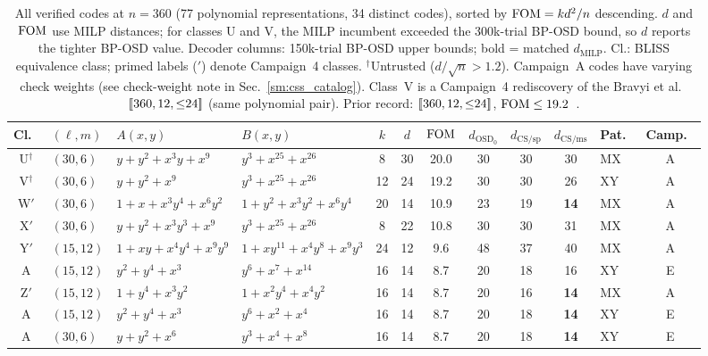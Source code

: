 \begin{table}[t]
\centering
\caption{All verified codes at $n = 360$ (77 polynomial representations, 34 distinct codes), sorted by $\mathrm{FOM} = kd^2/n$ descending.
$d$ and $\mathrm{FOM}$ use MILP distances; for classes U and V, the MILP incumbent exceeded the 300k-trial BP-OSD bound, so $d$ reports the tighter BP-OSD value.
Decoder columns: 150k-trial BP-OSD upper bounds; bold = matched $d_{\text{MILP}}$.
Cl.: BLISS equivalence class; primed labels ($'$) denote Campaign~4 classes.
$^\dagger$Untrusted ($d/\sqrt{n} > 1.2$).
Campaign~A codes have varying check weights (see check-weight note in Sec.~\ref{sm:css_catalog}).
Class~V is a Campaign~4 rediscovery of the Bravyi et al.\ $\lbrack\!\lbrack 360,12,{\leq}24 \rbrack\!\rbrack$ (same polynomial pair).
Prior record: $\lbrack\!\lbrack 360,12,{\leq}24 \rbrack\!\rbrack$, $\mathrm{FOM} \leq 19.2$~\protect\cite{bravyi2024high}.}
\label{tab:cat360}
\tiny
\begin{tabular*}{\textwidth}{@{\extracolsep{\fill}}clllcccccclc}
\toprule
Cl.\ & $(\ell,m)$ & $A(x,y)$ & $B(x,y)$ & $k$ & $d$ & $\mathrm{FOM}$ & $d_{\text{OSD}_0}$ & $d_{\text{CS/sp}}$ & $d_{\text{CS/ms}}$ & Pat.\ & Camp.\ \\
\midrule
U$^\dagger$ & $(30,6)$ & $y{+}y^{2}{+}x^{3}y{+}x^{9}$ & $y^{3}{+}x^{25}{+}x^{26}$ & 8 & 30 & 20.0 & 30 & 30 & 30 & MX & A \\
V$^\dagger$ & $(30,6)$ & $y{+}y^{2}{+}x^{9}$ & $y^{3}{+}x^{25}{+}x^{26}$ & 12 & 24 & 19.2 & 30 & 30 & 26 & XY & A \\
W$'$ & $(30,6)$ & $1{+}x{+}x^{3}y^{4}{+}x^{6}y^{2}$ & $1{+}y^{2}{+}x^{3}y^{2}{+}x^{6}y^{4}$ & 20 & 14 & 10.9 & 23 & 19 & \textbf{14} & MX & A \\
X$'$ & $(30,6)$ & $y{+}y^{2}{+}x^{3}y^{3}{+}x^{9}$ & $y^{3}{+}x^{25}{+}x^{26}$ & 8 & 22 & 10.8 & 30 & 30 & 31 & MX & A \\
Y$'$ & $(15,12)$ & $1{+}xy{+}x^{4}y^{4}{+}x^{9}y^{9}$ & $1{+}xy^{11}{+}x^{4}y^{8}{+}x^{9}y^{3}$ & 24 & 12 & 9.6 & 48 & 37 & 40 & MX & A \\
A & $(15,12)$ & $y^{2}{+}y^{4}{+}x^{3}$ & $y^{6}{+}x^{7}{+}x^{14}$ & 16 & 14 & 8.7 & 20 & 18 & 16 & XY & E \\
Z$'$ & $(15,12)$ & $1{+}y^{4}{+}x^{3}y^{2}$ & $1{+}x^{2}y^{4}{+}x^{4}y^{2}$ & 16 & 14 & 8.7 & 20 & 16 & \textbf{14} & MX & A \\
A & $(15,12)$ & $y^{2}{+}y^{4}{+}x^{3}$ & $y^{6}{+}x^{2}{+}x^{4}$ & 16 & 14 & 8.7 & 20 & 18 & \textbf{14} & XY & E \\
A & $(30,6)$ & $y{+}y^{2}{+}x^{6}$ & $y^{3}{+}x^{4}{+}x^{8}$ & 16 & 14 & 8.7 & 20 & 18 & \textbf{14} & XY & E \\

\end{tabular*}
\end{table}
